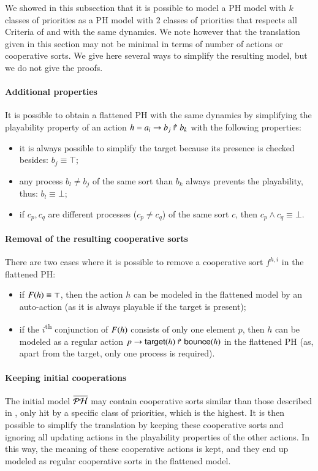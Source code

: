We showed in this subsection that it is possible to model a PH model with $k$ classes of priorities as a PH model
with $2$ classes of priorities that respects all Criteria of  and with the same dynamics.
We note however that the translation given in this section may not be minimal in terms of number of actions
or cooperative sorts.
We give here several ways to simplify the resulting model, but we do not give the proofs.

\paragraph{Additional properties}
It is possible to obtain a flattened PH with the same dynamics
by simplifying the playability property of an action $h = a_i\rightarrow b_j\Rsh b_k$ with the following properties:
\begin{itemize}
  \item it is always possible to simplify the target because its presence is checked besides: $b_j \equiv \top$;
  \item any process $b_l \neq b_j$ of the same sort than $b_k$ always prevents the playability, thus: $b_l \equiv \bot$;
  \item if $c_p, c_q$ are different processes ($c_p \neq c_q$) of the same sort $c$, then $c_p \wedge c_q \equiv \bot$.
\end{itemize}

\paragraph{Removal of the resulting cooperative sorts}
There are two cases where it is possible to remove a cooperative sort $f^{h,i}$ in the flattened PH:
\begin{itemize}
  \item if $F(h) \equiv \top$, then the action $h$ can be modeled in the flattened model by an auto-action
    (as it is always playable if the target is present);
  \item if the $i$\textsuperscript{th} conjunction of $F(h)$ consists of only one element $p$,
    then $h$ can be modeled as a regular action $p\rightarrow\mathsf{target}(h)\Rsh\mathsf{bounce}(h)$ in the flattened PH
    (as, apart from the target, only one process is required).
\end{itemize}

\paragraph{Keeping initial cooperations}
The initial model $\overline{\mathcal{PH}}$ may contain cooperative sorts similar than those described in ,
only hit by a specific class of priorities, which is the highest.
It is then possible to simplify the translation by keeping these cooperative sorts and ignoring all updating
actions in the playability properties of the other actions.
In this way, the meaning of these cooperative actions is kept, and they end up modeled as regular cooperative sorts
in the flattened model.
